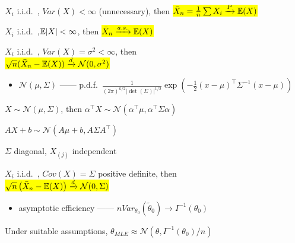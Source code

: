 \begin{prop}
    $X_i$ i.i.d.\ , $Var(X) < \infty$ (unnecessary), then \hl{$\bar{X}_n = \frac{1}{n} \sum X_i \xrightarrow{P} \mathbb{E}(X)$}
\end{prop}

\begin{thm}
    $X_i$ i.i.d.\ ,$\mathbb{E}|X| < \infty$, then \hl{$\bar X_n \xrightarrow{a.s.} \mathbb{E}(X)$}
\end{thm}

\begin{thm}
    $X_i$ i.i.d.\ , $Var(X) = \sigma^2 < \infty$, then\\ \hl{$\sqrt{n}(\bar X_n - \mathbb{E}(X)) \xrightarrow{d} \mathcal{N}(0, \sigma^2)$}
\end{thm}

\begin{itemize}
    \item $\mathcal{N}(\mu, \Sigma)$ ------ p.d.f.\ $\frac{1}{(2\pi)^{k/2} |\det(\Sigma)|^{1/2}} \exp\left( -\frac{1}{2}
    (x - \mu)^\top \Sigma^{-1}(x - \mu)\right)$
\end{itemize}

\begin{fact}
    $X \sim \mathcal{N}(\mu, \Sigma)$, then $\alpha^\top X \sim \mathcal{N}(\alpha^\top \mu, \alpha^\top\Sigma\alpha)$
\end{fact}

\begin{prop}
    $AX + b \sim \mathcal{N}(A\mu + b, A\Sigma A^\top)$
\end{prop}

\begin{prop}
    $\Sigma$ diagonal, $X_{(j)}$ independent
\end{prop}

\begin{thm}
    $X_i$ i.i.d.\ , $Cov(X) = \Sigma$ positive definite, then\\ \hl{$\sqrt{n}\left( \bar X_n  - \mathbb{E}(X)\right) \xrightarrow{d} \mathcal{N}(0, \Sigma)$}
\end{thm}

\begin{itemize}
    \item asymptotic efficiency ------ $nVar_{\theta_0}(\tilde \theta_0) \rightarrow I^{-1}(\theta_0)$
\end{itemize}

\begin{fact}
    Under suitable assumptions, $\theta_{MLE} \approx \mathcal{N}(\theta, I^{-1}(\theta_0)/n)$
\end{fact}

